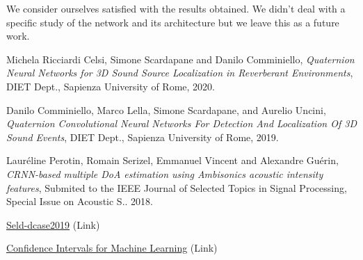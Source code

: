 \documentclass[11pt]{article}
\begin{document}
\noindent
We consider ourselves satisfied with the results obtained. We didn't deal with a specific study of the network and its architecture but we leave this as a future work.


\newpage
\begin{thebibliography}{999}

  Michela Ricciardi Celsi, Simone Scardapane and Danilo Comminiello,
  \emph{Quaternion Neural Networks for 3D Sound Source
Localization in Reverberant Environments},
  DIET Dept., Sapienza University of Rome,
  2020.

  Danilo Comminiello, Marco Lella, Simone Scardapane, and Aurelio Uncini,
  \emph{Quaternion Convolutional Neural Networks
For Detection And Localization Of 3D Sound Events},
  DIET Dept., Sapienza University of Rome,
  2019.

  Lauréline Perotin, Romain Serizel, Emmanuel Vincent and Alexandre Guérin,
  \emph{CRNN-based multiple DoA estimation using Ambisonics
acoustic intensity features}, Submited to the IEEE Journal of Selected
Topics in Signal Processing, Special Issue on Acoustic S.. 2018.
  
  \href{https://github.com/sharathadavanne/seld-dcase2019}{Seld-dcase2019} (Link)
  
  \href{https://machinelearningmastery.com/confidence-intervals-for-machine-learning/}{Confidence Intervals for Machine Learning} (Link)

\end{thebibliography}
\end{document}
